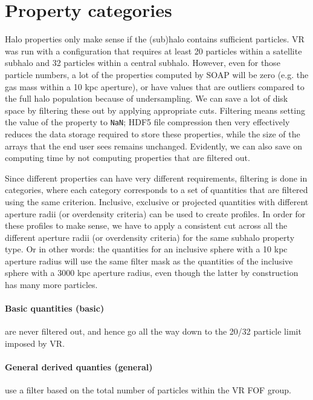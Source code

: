 \documentclass{article}
\begin{document}
\section{Property categories}

Halo properties only make sense if the (sub)halo contains sufficient particles. VR was run with a 
configuration that requires at least 20 particles within a satellite subhalo and 32 particles within a central 
subhalo. However, even for those particle numbers, a lot of the properties computed by SOAP will be zero (e.g. 
the gas mass within a 10 kpc aperture), or have values that are outliers compared to the full halo population 
because of undersampling. We can save a lot of disk space by filtering these out by applying appropriate cuts. 
Filtering means setting the value of the property to \verb+NaN+; HDF5 file compression then very effectively 
reduces the data storage required to store these properties, while the size of the arrays that the end user 
sees remains unchanged. Evidently, we can also save on computing time by not computing properties that are 
filtered out.

Since different properties can have very different requirements, filtering is done in categories, where each 
category corresponds to a set of quantities that are filtered using the same criterion. Inclusive, exclusive 
or projected quantities with different aperture radii (or overdensity criteria) can be used to create 
profiles. In order for these profiles to make sense, we have to apply a consistent cut across all the 
different aperture radii (or overdensity criteria) for the same subhalo property type. Or in other words: the 
quantities for an inclusive sphere with a 10 kpc aperture radius will use the same filter mask as the 
quantities of the inclusive sphere with a 3000 kpc aperture radius, even though the latter by construction has 
many more particles.

\paragraph{Basic quantities (basic)} are never filtered out, and hence go all the way down to the 20/32 
particle limit imposed by VR.

\paragraph{General derived quanties (general)} use a filter based on the total number of particles within the 
VR FOF group.
\end{document}
